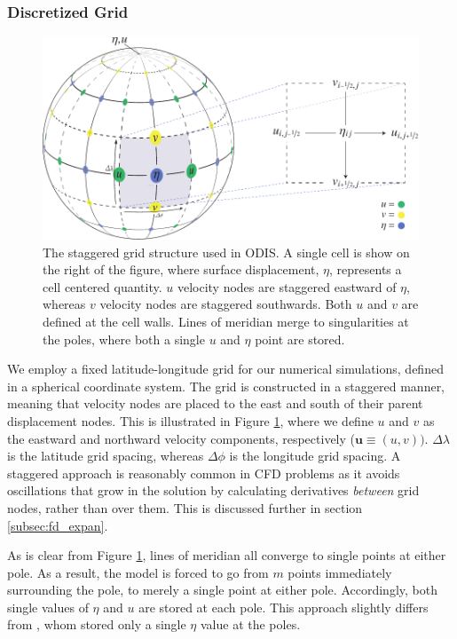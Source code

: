 \subsubsection{Discretized Grid \label{subsec:grid}}

\begin{figure}[t]
\centering
\includegraphics[width=0.8\linewidth]{Figures/GridDiagram}
\caption{The staggered grid structure used in ODIS. A single cell is show on the right of the figure, where surface displacement, $\eta$, represents a cell centered quantity. $u$ velocity nodes are staggered eastward of $\eta$, whereas $v$ velocity nodes are staggered southwards. Both $u$ and $v$ are defined at the cell walls. Lines of meridian merge to singularities at the poles, where both a single $u$ and $\eta$ point are stored.\label{fig:grid}}
\end{figure}

We employ a fixed latitude-longitude grid for our numerical simulations, defined in a spherical coordinate system. The grid is constructed in a staggered manner, meaning that velocity nodes are placed to the east and south of their parent displacement nodes. This is illustrated in Figure \ref{fig:grid}, where we define $u$ and $v$ as the eastward and northward velocity components, respectively ($\bm{u} \equiv \left(u,v\right))$. $\Delta \lambda$ is the latitude grid spacing, whereas $\Delta \phi$ is the longitude grid spacing. A staggered approach is reasonably common in CFD problems as it avoids oscillations that grow in the solution by calculating derivatives \textit{between} grid nodes, rather than over them. This is discussed further in section \ref{subsec:fd_expan}.

As is clear from Figure \ref{fig:grid}, lines of meridian all converge to single points at either pole. As a result, the model is forced to go from $m$ points immediately surrounding the pole, to merely a single point at either pole. Accordingly, both single values of $\eta$ and $u$ are stored at each pole. This approach slightly differs from \citet{sears1995tidal}, whom stored only a single $\eta$ value at the poles.

